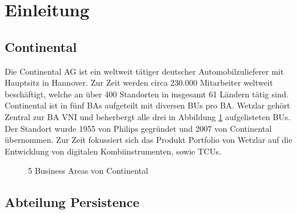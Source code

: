 
\ohead{\headmark}
\section{Einleitung}\label{section:introduction}
\subsection{Continental}\label{section:continental}
Die Continental AG ist ein weltweit tätiger deutscher Automobilzulieferer mit Hauptsitz in Hannover. Zur Zeit werden circa 230.000 Mitarbeiter weltweit beschäftigt, welche an über 400 Standorten in insgesamt 61 Ländern tätig sind.\\

Continental ist in fünf \acl{BA}s aufgeteilt mit diversen \acl{BU}s pro \acl{BA}.
Wetzlar gehört Zentral zur \acl{BA} \acl{VNI} und beherbergt alle drei in Abbildung \ref{fig:5business_areas} aufgelisteten \acl{BU}s.\\

Der Standort wurde 1955 von Philips gegründet und 2007 von Continental übernommen.
Zur Zeit fokussiert sich das Produkt Portfolio von Wetzlar auf die Entwicklung von digitalen Kombiinstrumenten, sowie \acl{TCU}s.\\

\begin{figure}[!h]
	\centering	
	\caption{5 Business Areas von Continental}
	\label{fig:5business_areas}
\end{figure}


\subsection{Abteilung Persistence}\label{section:persistence}

